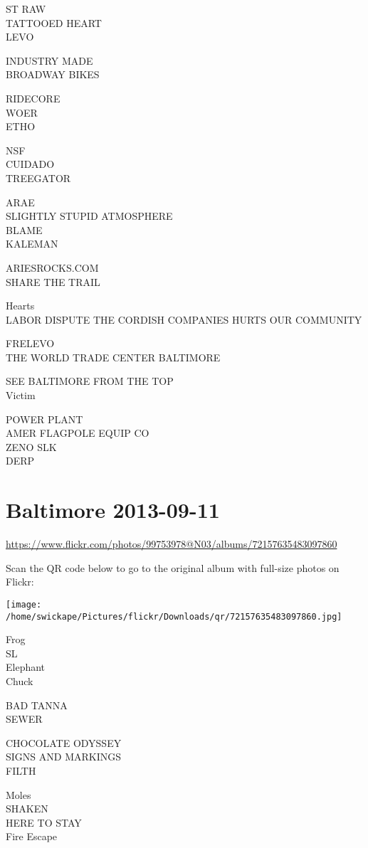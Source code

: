 \documentclass[10pt,letterpaper]{article}
\begin{document}
ST RAW\\
TATTOOED HEART\\
LEVO

INDUSTRY MADE\\
BROADWAY BIKES

RIDECORE\\
WOER\\
ETHO

NSF\\
CUIDADO\\
TREEGATOR

ARAE\\
SLIGHTLY STUPID ATMOSPHERE\\
BLAME\\
KALEMAN

ARIESROCKS.COM\\
SHARE THE TRAIL

Hearts\\
LABOR DISPUTE THE CORDISH COMPANIES HURTS OUR COMMUNITY

FRELEVO\\
THE WORLD TRADE CENTER BALTIMORE

SEE BALTIMORE FROM THE TOP\\
Victim

POWER PLANT\\
AMER FLAGPOLE EQUIP CO\\
ZENO SLK\\
DERP


\section*{Baltimore 2013-09-11}

\url{https://www.flickr.com/photos/99753978@N03/albums/72157635483097860}

Scan the QR code below to go to the original album with full-size photos on Flickr:

\texttt{[image: /home/swickape/Pictures/flickr/Downloads/qr/72157635483097860.jpg]}


Frog\\
SL\\
Elephant\\
Chuck

BAD TANNA\\
SEWER

CHOCOLATE ODYSSEY\\
SIGNS AND MARKINGS\\
FILTH

Moles\\
SHAKEN\\
HERE TO STAY\\
Fire Escape
\end{document}
